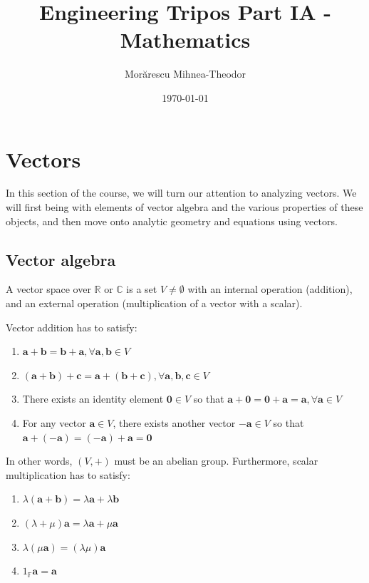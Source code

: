 \documentclass[12pt]{article}
\begin{document}
\title{Engineering Tripos Part IA - Mathematics}
\author{Morărescu Mihnea-Theodor}
\date{\today}

\maketitle

\newpage

\tableofcontents

\newpage

\section{Vectors}

In this section of the course, we will turn our attention to analyzing vectors. We will first being with elements of vector algebra and the various properties of these objects, and then move onto analytic geometry and equations using vectors.

\subsection{Vector algebra}

\begin{definition}
    A vector space over $\mathbb{R}$ or $\mathbb{C}$ is a set $V \neq \emptyset$ with an internal operation (addition), and an external operation (multiplication of a vector with a scalar). 

    Vector addition has to satisfy:

    \begin{enumerate}
        \item $\mathbf{a + b} = \mathbf{b + a}, \forall \mathbf{a, b} \in V$
        \item $(\mathbf{a + b}) + \mathbf{c} = \mathbf{a} + (\mathbf{b + c}), \forall \mathbf{a, b, c} \in V$
        \item There exists an identity element $\mathbf{0} \in V$ so that $\mathbf{a + 0} = \mathbf{0 + a} = \mathbf{a}, \forall \mathbf{a} \in V$
        \item For any vector $\mathbf{a} \in V$, there exists another vector $\mathbf{-a} \in V$ so that $\mathbf{a + (-a)} = \mathbf{(-a) + a} = \mathbf{0}$
    \end{enumerate}

    In other words, $(V, +)$ must be an abelian group. Furthermore, scalar multiplication has to satisfy:

    \begin{enumerate}
        \item $\lambda (\mathbf{a + b}) = \lambda \mathbf{a} + \lambda \mathbf{b}$
        \item $(\lambda + \mu)\mathbf{a} = \lambda\mathbf{a} + \mu\mathbf{a}$
        \item $\lambda(\mu\mathbf{a}) = (\lambda\mu)\mathbf{a}$
        \item $1_{\mathbb{F}}\mathbf{a} = \mathbf{a}$
    \end{enumerate}
\end{definition}
\end{document}
